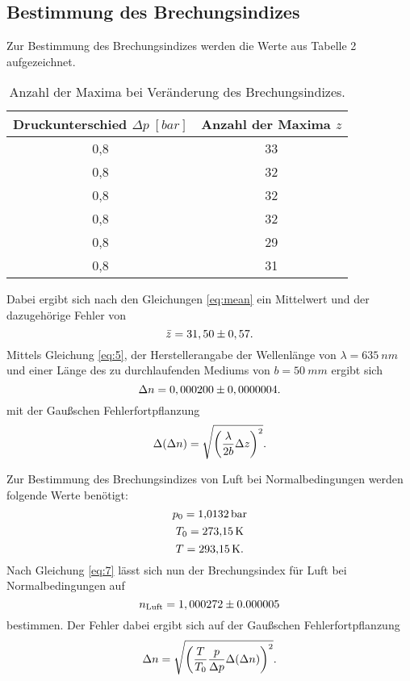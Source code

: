 \subsection{Bestimmung des Brechungsindizes}

Zur Bestimmung des Brechungsindizes werden die Werte aus Tabelle 2 aufgezeichnet.

\begin{table}[H]
    \begin{center}
      \label{tab:werte}
      \begin{tabular}{c|c}
        \hline
        \textbf{Druckunterschied $\Delta p \; [bar]$} & \textbf{Anzahl der Maxima $z$}\\
        \hline
        0,8 & 33 \\
        0,8 & 32 \\
        0,8 & 32 \\
        0,8 & 32 \\
        0,8 & 29 \\
        0,8 & 31
      \end{tabular}
      \caption{Anzahl der Maxima bei Veränderung des Brechungsindizes.}
    \end{center}
\end{table}

Dabei ergibt sich nach den Gleichungen \ref{eq:mean} ein Mittelwert und der dazugehörige Fehler von
\begin{equation}
    \bar{z} = 31,50 \pm 0,57.   \notag
\end{equation}
Mittels Gleichung \ref{eq:5}, der Herstellerangabe der Wellenlänge von $\lambda = \SI{635}{nm}$ und einer Länge des zu durchlaufenden Mediums von $b = \SI{50}{mm}$ ergibt sich
\begin{equation}
    \Delta n = 0,000200 \pm 0,0000004.    \notag
\end{equation}
mit der Gau\ss{}schen Fehlerfortpflanzung
\begin{equation}
    \Delta (\Delta n) = \sqrt{\left( \frac{\lambda}{2 b} \Delta z \right)^{2}}. \notag
\end{equation}

Zur Bestimmung des Brechungsindizes von Luft bei Normalbedingungen werden folgende Werte benötigt:
\begin{equation}
    p_0 = \SI{1,0132}{bar}  \notag
\end{equation}
\begin{equation}
    T_0 = \SI{273,15}{K}  \notag
\end{equation}
\begin{equation}
    T = \SI{293,15}{K}.  \notag
\end{equation}
Nach Gleichung \ref{eq:7} lässt sich nun der Brechungsindex für Luft bei Normalbedingungen auf
\begin{equation}
    n_\text{Luft} = 1,000272 \pm 0.000005   \notag
\end{equation}
bestimmen.
Der Fehler dabei ergibt sich auf der Gau\ss{}schen Fehlerfortpflanzung
\begin{equation}
    \Delta n = \sqrt{\left (\frac{T}{T_0} \frac{p}{\Delta p} \Delta (\Delta n) \right )^{2}}.   \notag
\end{equation}
